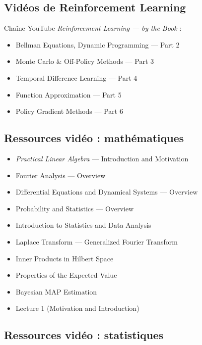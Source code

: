 \documentclass[11pt,a4paper]{article}
\newcommand{\1}{\mathbf{1}}
\begin{document}
\subsection{Vidéos de Reinforcement Learning}

\vspace{0.15cm}
Chaîne YouTube \emph{Reinforcement Learning --- by the Book} :
\begin{itemize}
  \item Bellman Equations, Dynamic Programming --- Part 2
  \item Monte Carlo \& Off-Policy Methods --- Part 3
  \item Temporal Difference Learning --- Part 4
  \item Function Approximation --- Part 5
  \item Policy Gradient Methods --- Part 6
\end{itemize}

\subsection{Ressources vidéo : mathématiques}

\begin{itemize}
  \item \emph{Practical Linear Algebra} --- Introduction and Motivation
  \item Fourier Analysis --- Overview
  \item Differential Equations and Dynamical Systems --- Overview
  \item Probability and Statistics --- Overview
  \item Introduction to Statistics and Data Analysis
  \item Laplace Transform --- Generalized Fourier Transform
  \item Inner Products in Hilbert Space
  \item Properties of the Expected Value
  \item Bayesian MAP Estimation
  \item Lecture 1 (Motivation and Introduction)
\end{itemize}

\subsection{Ressources vidéo : statistiques}
\end{document}
